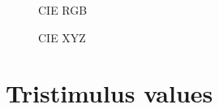 \begin{figure}
    \centering
    \caption{CIE RGB  \cite{humaneye}}
    \label{fig:rgb}
\end{figure}

\begin{figure}
    \centering
    \caption{CIE XYZ  \cite{humaneye}}
    \label{fig:xyz}
\end{figure}

\section{Tristimulus values}


